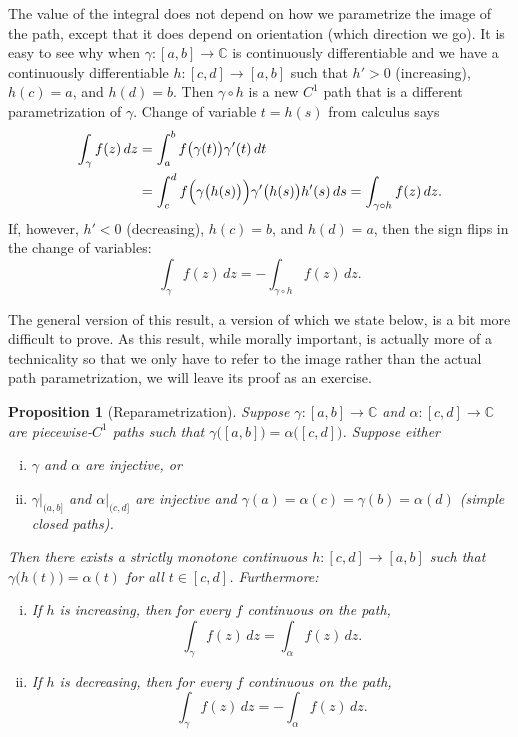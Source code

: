 \documentclass[12pt,openany]{book}
\newcommand{\C}{{\mathbb{C}}}
\theoremstyle{plain}
\newtheorem{prop}[thm]{Proposition}
\theoremstyle{remark}
\theoremstyle{definition}
\theoremstyle{exercise}
\theoremstyle{example}
\begin{document}
The value of the integral does not depend on how we parametrize the image of
the path, except that it does depend on orientation (which direction we
go).  It is easy to see why when
$\gamma \colon [a,b] \to \C$ is continuously differentiable and we have
a continuously differentiable $h \colon [c,d] \to [a,b]$ such
that $h' > 0$ (increasing), $h(c)=a$, and $h(d) = b$.  Then $\gamma \circ h$ is a new
$C^1$ path that is a different parametrization of $\gamma$.
Change of variable $t=h(s)$ from calculus says
\begin{equation*}
\begin{split}
\int_{\gamma} f(z) \, dz
& =
\int_a^b f\bigl( \gamma(t) \bigr) \gamma'(t) \, dt
\\
& =
\int_c^d f\Bigl( \gamma\bigl(h(s)\bigr) \Bigr) \gamma'\bigl(h(s)\bigr) h'(s) \, ds
=
\int_{\gamma \circ h} f(z) \, dz.
\end{split}
\end{equation*}
If, however, $h' < 0$ (decreasing), $h(c)=b$, and $h(d)=a$, then the
sign flips in the change of variables:
\begin{equation*}
\int_{\gamma} f(z) \, dz =
- \int_{\gamma \circ h} f(z) \, dz.
\end{equation*}

The general version of this result, a version of which we state below,
is a bit more difficult to prove.
As this result, while
morally important, is actually more of a technicality so that we only have
to refer to the image rather than the actual path parametrization, we will
leave its proof as an exercise.

\begin{prop}[Reparametrization]%
\label{prop:reparam}
Suppose $\gamma \colon [a,b] \to \C$ and $\alpha \colon [c,d] \to \C$ are
piecewise-$C^1$ paths such that
$\gamma\bigl([a,b]\bigr) = \alpha\bigl([c,d]\bigr)$.
Suppose either
\begin{enumerate}[(i)]
\item
$\gamma$ and $\alpha$ are injective, or
\item
$\gamma|_{(a,b]}$ and
$\alpha|_{(c,d]}$ are injective and 
$\gamma(a)=\alpha(c)=\gamma(b)=\alpha(d)$ (simple closed paths).
\end{enumerate}
Then there exists a strictly monotone continuous $h \colon [c,d] \to [a,b]$ such
that $\gamma\bigl(h(t)\bigr) = \alpha(t)$ for all $t \in [c,d]$.
Furthermore:
\begin{enumerate}[(i)]
\item
If $h$ is increasing, then for every $f$ continuous on the path,
\begin{equation*}
\int_\gamma f(z) \, dz = \int_{\alpha} f(z) \, dz .
\end{equation*}
\item
If $h$ is decreasing, then for every $f$ continuous on the path,
\begin{equation*}
\int_\gamma f(z) \, dz = - \int_{\alpha} f(z) \, dz .
\end{equation*}
\end{enumerate}
\end{prop}
\end{document}

